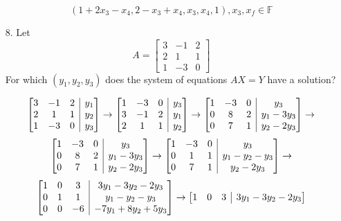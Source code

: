 \documentclass{article}
\makeatletter
\newenvironment{abmatrix}[1]
{
    \left[
        \begin{array} {@{}*{#1}{c}|c@{}}
}
{ 
        \end{array}
    \right]
}
\makeatother
\begin{document}
\begin{enumerate}[listparindent=\parindent]
\[
    \boxed{
        (1 + 2x_3 - x_4, 2 - x_3 + x_4, x_3, x_4, 1), x_3, x_f \in \mathbb F
    }
\]

\item[8.] Let
    \[
        A = \begin{bmatrix}
            3 & -1 & 2 \\
            2 & 1 & 1 \\
            1 & -3 & 0
        \end{bmatrix}
    \]
    For which \( (y_1, y_2, y_3) \) does the system of equations \(AX = Y\) have a solution?

\[
    \begin{abmatrix}{3}
        3 & -1 & 2 & y_1 \\
        2 & 1 & 1 & y_2 \\
        1 & -3 & 0 & y_3
    \end{abmatrix}
    \rightarrow
    \begin{abmatrix}{3}
        1 & -3 & 0 & y_3 \\
        3 & -1 & 2 & y_1 \\
        2 & 1 & 1 & y_2 
    \end{abmatrix}
    \rightarrow
    \begin{abmatrix}{3}
        1 & -3 & 0 & y_3 \\
        0 & 8 & 2 & y_1 - 3y_3 \\
        0 & 7 & 1 & y_2 - 2y_3
    \end{abmatrix}
    \rightarrow
\]
\[
    \begin{abmatrix}{3}
        1 & -3 & 0 & y_3 \\
        0 & 8 & 2 & y_1 - 3y_3 \\
        0 & 7 & 1 & y_2 - 2y_3
    \end{abmatrix}
    \rightarrow
    \begin{abmatrix}{3}
        1 & -3 & 0 & y_3 \\
        0 & 1 & 1 & y_1 - y_2 - y_3 \\
        0 & 7 & 1 & y_2 - 2y_3
    \end{abmatrix}
    \rightarrow
\]
\[
    \begin{abmatrix}{3}
        1 & 0 & 3 & 3y_1 - 3y_2 - 2y_3 \\
        0 & 1 & 1 & y_1 - y_2 - y_3 \\
        0 & 0 & -6 & -7y_1 + 8y_2 + 5y_3
    \end{abmatrix}
    \rightarrow
    \begin{abmatrix}{3}
        1 & 0 & 3 & 3y_1 - 3y_2 - 2y_3 \\

\end{abmatrix}\]
\end{enumerate}
\end{document}

